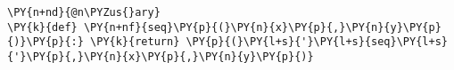 \begin{Verbatim}[commandchars=\\\{\}]
\PY{n+nd}{@n\PYZus{}ary}
\PY{k}{def} \PY{n+nf}{seq}\PY{p}{(}\PY{n}{x}\PY{p}{,}\PY{n}{y}\PY{p}{)}\PY{p}{:} \PY{k}{return} \PY{p}{(}\PY{l+s}{'}\PY{l+s}{seq}\PY{l+s}{'}\PY{p}{,}\PY{n}{x}\PY{p}{,}\PY{n}{y}\PY{p}{)}
\end{Verbatim}
